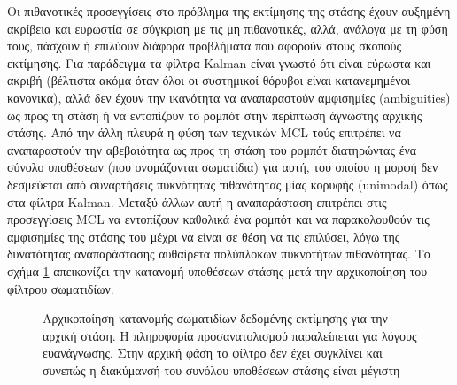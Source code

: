 Οι πιθανοτικές προσεγγίσεις στο πρόβλημα της εκτίμησης της στάσης έχουν
αυξημένη ακρίβεια και ευρωστία σε σύγκριση με τις μη πιθανοτικές, αλλά, ανάλογα
με τη φύση τους, πάσχουν ή επιλύουν διάφορα προβλήματα που αφορούν στους σκοπούς
εκτίμησης. Για παράδειγμα τα φίλτρα Kalman είναι γνωστό ότι είναι εύρωστα
και ακριβή (βέλτιστα ακόμα όταν όλοι οι συστημικοί θόρυβοι είναι κατανεμημένοι
κανονικα), αλλά δεν έχουν την ικανότητα να αναπαραστούν αμφισημίες
(ambiguities) ως προς τη στάση ή να εντοπίζουν το ρομπότ στην περίπτωση
άγνωστης αρχικής στάσης. Από την άλλη πλευρά η φύση των τεχνικών MCL
\cite{Dellaert} τούς επιτρέπει να αναπαραστούν την αβεβαιότητα ως προς τη στάση
του ρομπότ διατηρώντας ένα σύνολο υποθέσεων (που ονομάζονται σωματίδια) για
αυτή, του οποίου η μορφή δεν δεσμεύεται από συναρτήσεις πυκνότητας πιθανότητας
μίας κορυφής (unimodal) όπως στα φίλτρα Kalman. Μεταξύ άλλων αυτή η
αναπαράσταση επιτρέπει στις προσεγγίσεις MCL να εντοπίζουν καθολικά ένα ρομπότ
και να παρακολουθούν τις αμφισημίες της στάσης του μέχρι να είναι σε θέση να τις
επιλύσει, λόγω της δυνατότητας αναπαράστασης αυθαίρετα πολύπλοκων πυκνοτήτων
πιθανότητας. Το σχήμα \ref{fig:pf_init} απεικονίζει την κατανομή υποθέσεων
στάσης μετά την αρχικοποίηση του φίλτρου σωματιδίων.

\begin{figure}[htbp]\centering
  
  \caption{\small Αρχικοποίηση κατανομής σωματιδίων δεδομένης εκτίμησης για την
           αρχική στάση. Η πληροφορία προσανατολισμού παραλείπεται για λόγους
           ευανάγνωσης. Στην αρχική φάση το φίλτρο δεν έχει συγκλίνει και
           συνεπώς η διακύμανσή του συνόλου υποθέσεων στάσης είναι μέγιστη}
  \label{fig:pf_init}
\end{figure}


